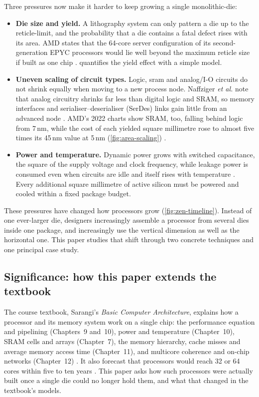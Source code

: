 Three pressures now make it harder to keep growing a single \gls{monolithic-die}:

\begin{itemize}
  \item \textbf{Die size and yield.} A lithography system can only pattern a die up to the \gls{reticle-limit}, and the probability that a die contains a fatal defect rises with its area. AMD states that the 64-core server configuration of its second-generation EPYC processors would lie well beyond the maximum reticle size if built as one chip \cite{naffziger2020chiplet}.  quantifies the yield effect with a simple model.
  \item \textbf{Uneven scaling of circuit types.} Logic, \gls{sram} and analog/I-O circuits do not shrink equally when moving to a new process node. Naffziger \emph{et al.} note that analog circuitry shrinks far less than digital logic and SRAM, so memory interfaces and serialiser--deserialiser (SerDes) links gain little from an advanced node \cite{naffziger2020chiplet}. AMD's 2022 charts show SRAM, too, falling behind logic from 7\,nm, while the cost of each yielded square millimetre rose to almost five times its 45\,nm value at 5\,nm (\cref{fig:area-scaling}) \cite[slide~6]{wuu2022vcache}.
  \item \textbf{Power and temperature.} Dynamic power grows with switched capacitance, the square of the supply voltage and clock frequency, while leakage power is consumed even when circuits are idle and itself rises with temperature \cite[sec.~10.10]{sarangi2025basic}. Every additional square millimetre of active silicon must be powered and cooled within a fixed package budget.
\end{itemize}

These pressures have changed how processors grow (\cref{fig:zen-timeline}). Instead of one ever-larger die, designers increasingly assemble a processor from several dies inside one package, and increasingly use the vertical dimension as well as the horizontal one. This paper studies that shift through two concrete techniques and one principal case study.



\subsection{Significance: how this paper extends the textbook}
\label{sec:significance}
The course textbook, Sarangi's \emph{Basic Computer Architecture}, explains how a processor and its memory system work on a single chip: the performance equation and pipelining (Chapters~9 and~10), power and temperature (Chapter~10), SRAM cells and arrays (Chapter~7), the memory hierarchy, cache misses and average memory access time (Chapter~11), and multicore coherence and on-chip networks (Chapter~12) \cite{sarangi2025basic}. It also forecast that processors would reach 32 or 64 cores within five to ten years \cite[sec.~12.1.2]{sarangi2025basic}. This paper asks how such processors were actually built once a single die could no longer hold them, and what that changed in the textbook's models.

